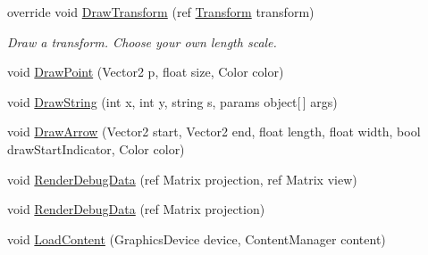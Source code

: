 \begin{DoxyCompactItemize}
\item 
override void \hyperlink{class_farseer_physics_1_1_debug_views_1_1_debug_view_x_n_a_af5c82364068ab0aa715596db3744e982}{Draw\+Transform} (ref \hyperlink{struct_farseer_physics_1_1_common_1_1_transform}{Transform} transform)
\begin{DoxyCompactList}\small\item\em Draw a transform. Choose your own length scale. \end{DoxyCompactList}\item 
void \hyperlink{class_farseer_physics_1_1_debug_views_1_1_debug_view_x_n_a_ab7f7b79e3bcb78cbd842db94541d89c2}{Draw\+Point} (Vector2 p, float size, Color color)
\item 
void \hyperlink{class_farseer_physics_1_1_debug_views_1_1_debug_view_x_n_a_a617a00aeb1169d04755a5014cec80639}{Draw\+String} (int x, int y, string s, params object\mbox{[}$\,$\mbox{]} args)
\item 
void \hyperlink{class_farseer_physics_1_1_debug_views_1_1_debug_view_x_n_a_a4c164391075a56e1b478d9c30cb6c828}{Draw\+Arrow} (Vector2 start, Vector2 end, float length, float width, bool draw\+Start\+Indicator, Color color)
\item 
void \hyperlink{class_farseer_physics_1_1_debug_views_1_1_debug_view_x_n_a_a4db37bedf47439df6bf4e49ac883ccc8}{Render\+Debug\+Data} (ref Matrix projection, ref Matrix view)
\item 
void \hyperlink{class_farseer_physics_1_1_debug_views_1_1_debug_view_x_n_a_a47ecd4649b53f9fe64f0a4636b2bed36}{Render\+Debug\+Data} (ref Matrix projection)
\item 
void \hyperlink{class_farseer_physics_1_1_debug_views_1_1_debug_view_x_n_a_aebcae450d2982a848fae2bde43e68067}{Load\+Content} (Graphics\+Device device, Content\+Manager content)
\end{DoxyCompactItemize}
